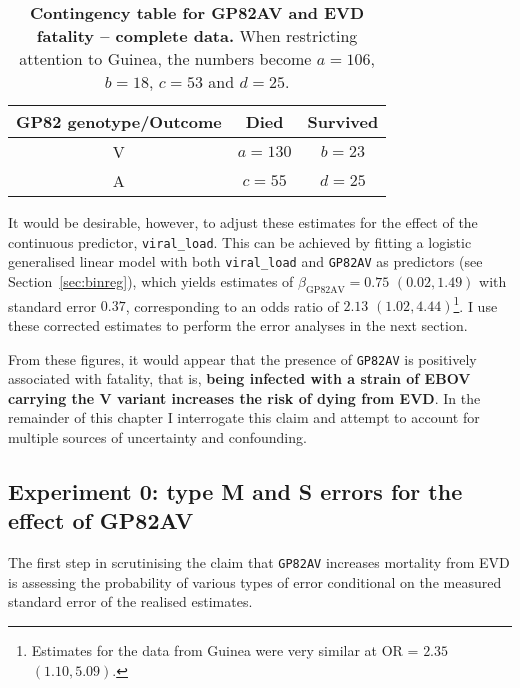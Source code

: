 \begin{minipage}{\textwidth}  
\setcounter{mpfootnote}{\value{footnote}}
\renewcommand{\thempfootnote}{\arabic{mpfootnote}}
\fontsize{9}{11}\selectfont
\begin{longtable}{ccc}
\caption[Contingency table for GP82AV and EVD fatality -- complete data.]{\textbf{Contingency table for GP82AV and EVD fatality -- complete data.} When restricting attention to Guinea, the numbers become $a = 106$, $b = 18$, $c = 53$ and $d = 25$.}
\label{tab:rawData}\\
 \hline
GP82 genotype/Outcome & Died & Survived\\ 
  \hline
V & $a = 130$ & $b = 23$ \\ 
A & $c = 55$ & $d = 25$ \\ 
   \hline
\end{longtable}
\setcounter{footnote}{\value{mpfootnote}}
\end{minipage}

It would be desirable, however, to adjust these estimates for the effect of the continuous predictor, \verb|viral_load|.
This can be achieved by fitting a logistic generalised linear model with both \verb|viral_load| and \verb|GP82AV| as predictors (see Section~\ref{sec:binreg}), which yields estimates of $\beta_{\text{GP82AV}} =  0.75$ $(0.02,1.49)$ with standard error $0.37$, corresponding to an odds ratio of $2.13$ $(1.02, 4.44)$\footnote{Estimates for the data from Guinea were very similar at OR = $2.35$ $(1.10, 5.09)$.}.
I use these corrected estimates to perform the error analyses in the next section.

From these figures, it would appear that the presence of \verb|GP82AV| is positively associated with fatality, that is, \textbf{being infected with a strain of EBOV carrying the V variant increases the risk of dying from EVD}. 
In the remainder of this chapter I interrogate this claim and attempt to account for multiple sources of uncertainty and confounding.

\subsection{Experiment 0: type M and S errors for the effect of  GP82AV}
\label{sec:results-MandS}

The first step in scrutinising the claim that \verb|GP82AV| increases mortality from EVD is assessing the probability of various types of error conditional on the measured standard error of the realised estimates.

